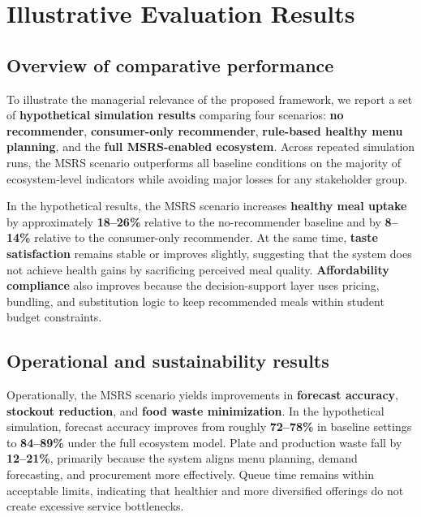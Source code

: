\documentclass[
  letterpaper,
  DIV=11,
  numbers=noendperiod]{scrartcl}
\begin{document}
\section{Illustrative Evaluation
Results}\label{illustrative-evaluation-results}

\subsection{Overview of comparative
performance}\label{overview-of-comparative-performance}

To illustrate the managerial relevance of the proposed framework, we
report a set of \textbf{hypothetical simulation results} comparing four
scenarios: \textbf{no recommender}, \textbf{consumer-only recommender},
\textbf{rule-based healthy menu planning}, and the \textbf{full
MSRS-enabled ecosystem}. Across repeated simulation runs, the MSRS
scenario outperforms all baseline conditions on the majority of
ecosystem-level indicators while avoiding major losses for any
stakeholder group.

In the hypothetical results, the MSRS scenario increases \textbf{healthy
meal uptake} by approximately \textbf{18--26\%} relative to the
no-recommender baseline and by \textbf{8--14\%} relative to the
consumer-only recommender. At the same time, \textbf{taste satisfaction}
remains stable or improves slightly, suggesting that the system does not
achieve health gains by sacrificing perceived meal quality.
\textbf{Affordability compliance} also improves because the
decision-support layer uses pricing, bundling, and substitution logic to
keep recommended meals within student budget constraints.

\subsection{Operational and sustainability
results}\label{operational-and-sustainability-results}

Operationally, the MSRS scenario yields improvements in \textbf{forecast
accuracy}, \textbf{stockout reduction}, and \textbf{food waste
minimization}. In the hypothetical simulation, forecast accuracy
improves from roughly \textbf{72--78\%} in baseline settings to
\textbf{84--89\%} under the full ecosystem model. Plate and production
waste fall by \textbf{12--21\%}, primarily because the system aligns
menu planning, demand forecasting, and procurement more effectively.
Queue time remains within acceptable limits, indicating that healthier
and more diversified offerings do not create excessive service
bottlenecks.
\end{document}
